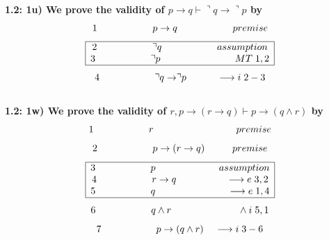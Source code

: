 \documentclass[a4paper]{article}
\begin{document}
\textbf{{\large\hspace{1 cm} 1.2: 1u) We prove the validity of $p \rightarrow q \vdash \urcorner q \rightarrow \urcorner p$ by}}
{\large $$1 \hspace{2 cm} p \rightarrow q \hspace{2 cm} premise$$ 
$$\begin{array}{|c|}
\hline 
\textcolor{black}{2 \hspace{2 cm} \urcorner q \hspace{2 cm} assumption}\\ 

\textcolor{black}{3 \hspace{2 cm} \urcorner p \hspace{2.7 cm} MT\hspace{0.1 cm} 1,2}\\ 
\hline
\end{array}$$ $$4 \hspace{2 cm} \urcorner q \rightarrow \urcorner p \hspace{1.1 cm} \longrightarrow i\hspace{0.1 cm} 2-3$$}\\

\textbf{{\large\hspace{1 cm} 1.2: 1w) We prove the validity of $r,p \rightarrow (r \rightarrow q) \vdash p \rightarrow (q\wedge r)$ by}}
{\large $$1 \hspace{2 cm} r \hspace{3 cm} premise$$ $$2 \hspace{2 cm} p \rightarrow (r \rightarrow q) \hspace{1 cm} premise$$
$$\begin{array}{|c|}
\hline 
\textcolor{black}{3 \hspace{2 cm} p \hspace{2.3 cm} assumption}\\ 

\textcolor{black}{4 \hspace{2 cm} r \rightarrow q \hspace{1.8 cm} \longrightarrow e\hspace{0.1 cm} 3,2}\\ 

\textcolor{black}{5 \hspace{2 cm} q \hspace{2.6 cm} \longrightarrow e\hspace{0.1 cm} 1,4}\\ 
\hline
\end{array}$$ $$6 \hspace{2 cm}  q \wedge r \hspace{2.4 cm} \wedge i\hspace{0.1 cm} 5,1$$ $$7 \hspace{2 cm} p \rightarrow (q\wedge r) \hspace{0.4 cm} \longrightarrow i\hspace{0.1 cm} 3-6$$}\\
\end{document}

